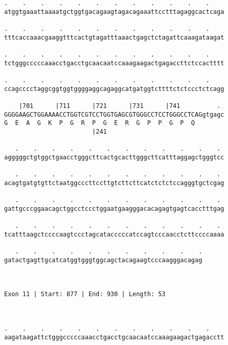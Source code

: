 \documentclass{article}
\begin{document}
\begin{Verbatim}
.    .    .    .    .    .    .    .    .    .    .    .    
atggtgaaattaaaatgctggtgacagaagtagacagaaattcctttagaggcactcaga
                                                            
.    .    .    .    .    .    .    .    .    .    .    .    
tttcaccaaacgaaggtttcactgtagatttaaactgagctctagattcaaagataagat
                                                            
.    .    .    .    .    .    .    .    .    .    .    .    
tctgggcccccaaacctgacctgcaacaatccaaagaagactgagaccttctccactttt
                                                            
.    .    .    .    .    .    .    .    .    .    .    .    
ccagcccctaggcggtggtggggaggcagaggcatgatggtcttttctctccctctcagg
                                                            
    |701      |711      |721      |731      |741          . 
GGGGAAGCTGGAAAACCTGGTCGTCCTGGTGAGCGTGGGCCTCCTGGGCCTCAGgtgagc
G  E  A  G  K  P  G  R  P  G  E  R  G  P  P  G  P  Q        
                        |241                                
  
   .    .    .    .    .    .    .    .    .    .    .    . 
agggggctgtggctgaacctgggcttcactgcacttgggcttcatttaggagctgggtcc
                                                            
   .    .    .    .    .    .    .    .    .    .    .    . 
acagtgatgtgttctaatggcccttccttgtcttcttcatctctctccagggtgctcgag
                                                            
   .    .    .    .    .    .    .    .    .    .    .    . 
gattgcccggaacagctggcctccctggaatgaagggacacagagtgagtcacctttgag
                                                            
   .    .    .    .    .    .    .    .    .    .    .    . 
tcatttaagctccccaagtccctagcatacccccatccagtcccaacctcttccccaaaa
                                                            
   .    .    .    .    .    .    .    .    .    .    .
gatactgagttgcatcatggtgggtggcagctacagaagtcccaagggacagag
                                                      
                                                      
 
Exon 11 | Start: 877 | End: 930 | Length: 53



.    .    .    .    .    .    .    .    .    .    .    .    
aagataagattctgggcccccaaacctgacctgcaacaatccaaagaagactgagacctt
                                                            

\end{Verbatim}
\end{document}
